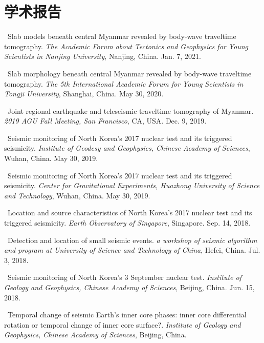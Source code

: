 \section*{学术报告}
\begin{etaremune}
\item
    \Yao\
    Slab models beneath central Myanmar revealed by body-wave traveltime tomography.
    \textit{The Academic Forum about Tectonics and Geophysics for Young Scientists in Nanjing University}, Nanjing, China.
    Jan. 7, 2021.
\item
    \Yao\
    Slab morphology beneath central Myanmar revealed by body-wave traveltime tomography.
    \textit{The 5th International Academic Forum for Young Scientists in Tongji University}, Shanghai, China.
    May 30, 2020.
    \invited
\item
    \Yao\
    Joint regional earthquake and teleseismic traveltime tomography of Myanmar.
    \textit{2019 AGU Fall Meeting, San Francisco}, CA, USA.
    Dec. 9, 2019.
\item
    \Yao\
    Seismic monitoring of North Korea’s 2017 nuclear test and its triggered seismicity.
    \textit{Institute of Geodesy and Geophysics, Chinese Academy of Sciences}, Wuhan, China.
    May 30, 2019.
    \invited
\item
    \Yao\
    Seismic monitoring of North Korea’s 2017 nuclear test and its triggered seismicity.
    \textit{Center for Gravitational Experiments, Huazhong University of Science and Technology}, Wuhan, China.
    May 30, 2019.
\item
    \Yao\
    Location and source characteristics of North Korea’s 2017 nuclear test and its triggered seismicity.
    \textit{Earth Observatory of Singapore}, Singapore.
    Sep. 14, 2018.
    \invited
\item
    \Yao\
    Detection and location of small seismic events.
    \textit{a workshop of seismic algorithm and program at University of Science and Technology of China}, Hefei, China.
    Jul. 3, 2018.
    \invited
\item
    \Yao\
    Seismic monitoring of North Korea’s 3 September nuclear test.
    \textit{Institute of Geology and Geophysics, Chinese Academy of Sciences}, Beijing, China.
    Jun. 15, 2018.
    \invited
\item
    \Yao\
    Temporal change of seismic Earth’s inner core phases: inner core differential rotation or temporal change of inner core surface?.
    \textit{Institute of Geology and Geophysics, Chinese Academy of Sciences}, Beijing, China.

\end{etaremune}
